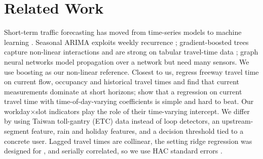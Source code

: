 \section{Related Work}
Short-term traffic forecasting has moved from time-series models to machine learning
\citep{vlahogianni2014}. Seasonal ARIMA exploits weekly recurrence \citep{williams2003};
gradient-boosted trees capture non-linear interactions and are strong on tabular travel-time data
\citep{zhang2015,ke2017}; graph neural networks model propagation over a network
\citep{li2018,yu2018} but need many sensors. We use boosting as our non-linear reference.
Closest to us, \citet{kwon2000} regress freeway travel time on current flow, occupancy and
historical travel times and find that current measurements dominate at short horizons;
\citet{rice2004} show that a regression on current travel time with time-of-day-varying
coefficients is simple and hard to beat. Our workday$\times$\allowbreak slot indicators play the role
of their time-varying intercept. We differ by using Taiwan toll-gantry (ETC) data instead of loop
detectors, an upstream-segment feature, rain and holiday features, and a decision threshold tied
to a concrete user. Lagged travel times are collinear, the setting ridge regression was designed
for \citep{hoerl1970}, and serially correlated, so we use HAC standard errors \citep{newey1987}.
